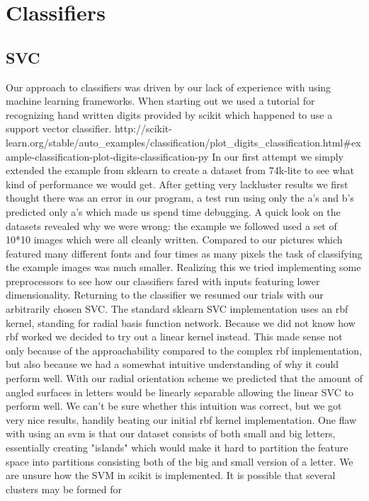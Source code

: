 \documentclass[paper=a4, fontsize=11pt]{scrartcl} %
\numberwithin{equation}{section} %
\numberwithin{figure}{section} %
\numberwithin{table}{section} %
\begin{document}
\section{Classifiers}
\subsection{SVC}
Our approach to classifiers was driven by our lack of experience with
using machine learning frameworks.  When starting out we used a
tutorial for recognizing hand written digits provided by scikit which
happened to use a support vector classifier. %
http://scikit-learn.org/stable/auto_examples/classification/plot_digits_classification.html#example-classification-plot-digits-classification-py
In our first attempt we simply extended the example from sklearn to
create a dataset from 74k-lite to see what kind of performance we
would get.  After getting very lackluster results we first thought
there was an error in our program, a test run using only the a's and
b's predicted only a's which made us spend time debugging.  A quick
look on the datasets revealed why we were wrong: the example we
followed used a set of 10*10 images which were all cleanly written.
Compared to our pictures which featured many different fonts and four
times as many pixels the task of classifying the example images was
much smaller.  Realizing this we tried implementing some preprocessors
to see how our classifiers fared with inputs featuring lower
dimensionality.  Returning to the classifier we resumed our trials
with our arbitrarily chosen SVC.  The standard sklearn SVC
implementation uses an rbf kernel, standing for radial basis function
network.  Because we did not know how rbf worked we decided to try out
a linear kernel instead.  This made sense not only because of the
approachability compared to the complex rbf implementation, but also
because we had a somewhat intuitive understanding of why it could
perform well.  With our radial orientation scheme we predicted that
the amount of angled surfaces in letters would be linearly separable
allowing the linear SVC to perform well.  We can't be sure whether
this intuition was correct, but we got very nice results, handily
beating our initial rbf kernel implementation.  One flaw with using an
svm is that our dataset consists of both small and big letters,
essentially creating "islands" which would make it hard to partition
the feature space into partitions consisting both of the big and small
version of a letter.  We are unsure how the SVM in scikit is
implemented.  It is possible that several clusters may be formed for
\end{document}
